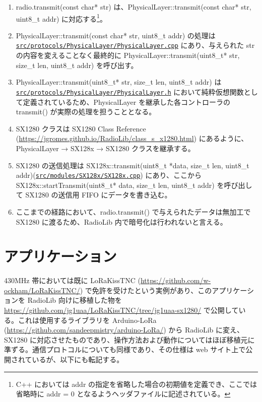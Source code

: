 \documentclass[a4j,oneside]{ujbook}
\begin{document}
\begin{enumerate}
 \item radio.transmit(const char* str) は、PhysicalLayer::transmit(const char* str, uint8\_t addr) に対応する\footnote{C++ においては addr の指定を省略した場合の初期値を定義でき、ここでは省略時に addr = 0 となるようヘッダファイルに記述されている。}。
 \item PhysicalLayer::transmit(const char* str, uint8\_t addr) の処理は\newline\href{https://github.com/jgromes/RadioLib/blob/master/src/protocols/PhysicalLayer/PhysicalLayer.cpp}{\tt{src/protocols/PhysicalLayer/PhysicalLayer.cpp}} にあり、\newline 与えられた str の内容を変えることなく最終的に PhysicalLayer::transmit(uint8\_t* str, size\_t len, uint8\_t addr) を呼び出す。
 \item PhysicalLayer::transmit(uint8\_t* str, size\_t len, uint8\_t addr) は\newline\href{https://github.com/jgromes/RadioLib/blob/master/src/protocols/PhysicalLayer/PhysicalLayer.h}{\tt{src/protocols/PhysicalLayer/PhysicalLayer.h}} において純粋仮想関数として定義されているため、PhysicalLayer を継承した各コントローラの transmit() が実際の処理を担うこととなる。
 \item SX1280 クラスは SX1280 Class Reference (\url{https://jgromes.github.io/RadioLib/class_s_x1280.html}) にあるように、PhysicalLayer → SX128x → SX1280 クラスを継承する。
 \item SX1280 の送信処理は SX128x::transmit(uint8\_t *data, size\_t len, uint8\_t addr)\newline(\href{https://github.com/jgromes/RadioLib/blob/master/src/modules/SX128x/SX128x.cpp}{\tt{src/modules/SX128x/SX128x.cpp}}) にあり、ここから SX128x::startTransmit(uint8\_t* data, size\_t len, uint8\_t addr) を呼び出して SX1280 の送信用 FIFO にデータを書き込む。
 \item ここまでの経路において、radio.transmit() で与えられたデータは無加工で SX1280 に渡るため、RadioLib 内で暗号化は行われないと言える。
\end{enumerate}

\section*{アプリケーション}

430MHz 帯においては既に LoRaKissTNC (\url{https://github.com/w-ockham/LoRaKissTNC/}) で免許を受けたという実例があり、このアプリケーションを RadioLib 向けに移植した物を \url{https://github.com/jg1uaa/LoRaKissTNC/tree/jg1uaa-sx1280/} で公開している。これは使用するライブラリを Arduino-LoRa (\url{https://github.com/sandeepmistry/arduino-LoRa/}) から RadioLib に変え、SX1280 に対応させたものであり、操作方法および動作についてはほぼ移植元に準ずる。通信プロトコルについても同様であり、その仕様は web サイト上で公開されているが、以下にも転記する。
\end{document}
